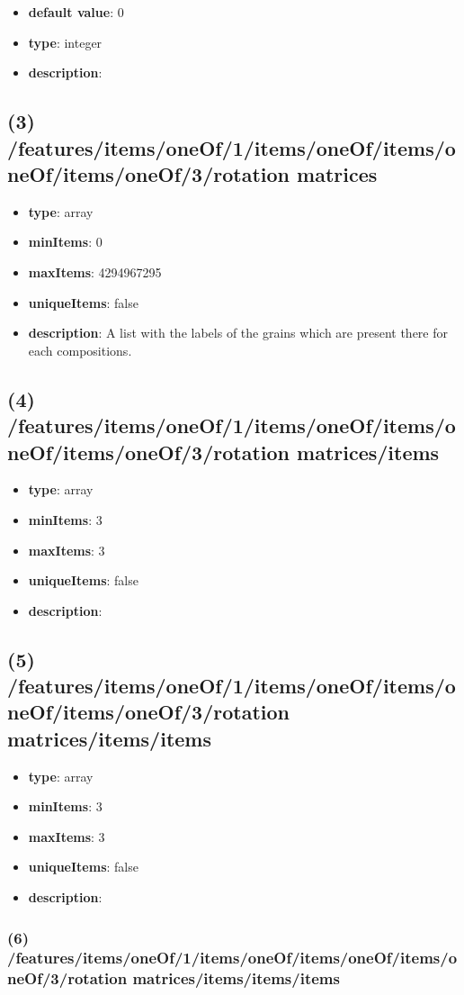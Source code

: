 \begin{itemize}[leftmargin=4em]\item {\bf default value}: 0
\item {\bf type}: integer
\item {\bf description}: 
\end{itemize}\subsection{(3) /features/items/oneOf/1/items/oneOf/items/oneOf/items/oneOf/3/rotation matrices}
\begin{itemize}[leftmargin=3em]\item {\bf type}: array
\item {\bf minItems}: 0
\item {\bf maxItems}: 4294967295
\item {\bf uniqueItems}: false
\item {\bf description}: A list with the labels of the grains which are present there for each compositions.
\end{itemize}\subsection{(4) /features/items/oneOf/1/items/oneOf/items/oneOf/items/oneOf/3/rotation matrices/items}
\begin{itemize}[leftmargin=4em]\item {\bf type}: array
\item {\bf minItems}: 3
\item {\bf maxItems}: 3
\item {\bf uniqueItems}: false
\item {\bf description}: 
\end{itemize}\subsection{(5) /features/items/oneOf/1/items/oneOf/items/oneOf/items/oneOf/3/rotation matrices/items/items}
\begin{itemize}[leftmargin=5em]\item {\bf type}: array
\item {\bf minItems}: 3
\item {\bf maxItems}: 3
\item {\bf uniqueItems}: false
\item {\bf description}: 
\end{itemize}\subsubsection{(6) /features/items/oneOf/1/items/oneOf/items/oneOf/items/oneOf/3/rotation matrices/items/items/items}

